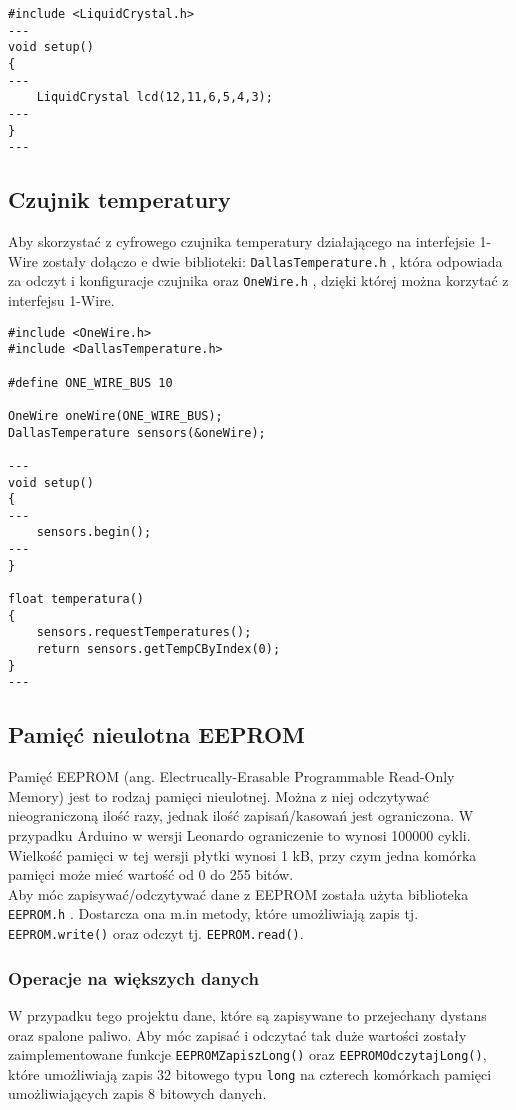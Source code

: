 \begin{lstlisting}[label=list:lcd_setup,caption=Inicjalizacja wyświetlacza,
basicstyle=\footnotesize\ttfamily]
#include <LiquidCrystal.h>
---
void setup()
{
---
    LiquidCrystal lcd(12,11,6,5,4,3);
---
}
---
\end{lstlisting}

\subsection{Czujnik temperatury}

Aby skorzystać z cyfrowego czujnika temperatury działającego na interfejsie 1-Wire zostały dołączo e dwie biblioteki: \texttt{DallasTemperature.h} \cite{lib_dallas}, która odpowiada za odczyt i konfiguracje czujnika oraz \texttt{OneWire.h} \cite{lib_onewire}, dzięki której można korzytać z interfejsu 1-Wire.

\begin{lstlisting}[label=list:d18s20_setup,caption=Inicjalizacja czujnika i odczyt temperatury,
basicstyle=\footnotesize\ttfamily]
#include <OneWire.h>
#include <DallasTemperature.h>

#define ONE_WIRE_BUS 10

OneWire oneWire(ONE_WIRE_BUS);
DallasTemperature sensors(&oneWire);

---
void setup()
{
---
    sensors.begin();
---
}

float temperatura() 
{
    sensors.requestTemperatures();
    return sensors.getTempCByIndex(0);
}
---
\end{lstlisting}


\subsection{Pamięć nieulotna EEPROM}
Pamięć EEPROM (ang. Electrucally-Erasable Programmable Read-Only Memory) jest to rodzaj pamięci nieulotnej. Można z niej odczytywać nieograniczoną ilość razy, jednak ilość zapisań/kasowań jest ograniczona. W przypadku Arduino w wersji Leonardo ograniczenie to wynosi 100000 cykli. Wielkość pamięci w tej wersji płytki wynosi 1 kB, przy czym jedna komórka pamięci może mieć wartość od 0 do 255 bitów.\\
Aby móc zapisywać/odczytywać dane z EEPROM została użyta biblioteka \texttt{EEPROM.h} \cite{lib_eeprom}. Dostarcza ona m.in metody, które umożliwiają zapis tj. \texttt{EEPROM.write()} oraz odczyt tj. \texttt{EEPROM.read()}.
\subsubsection{Operacje na większych danych}
W przypadku tego projektu dane, które są zapisywane to przejechany dystans oraz spalone paliwo. Aby móc zapisać i odczytać tak duże wartości zostały zaimplementowane funkcje \texttt{EEPROMZapiszLong()} oraz \texttt{EEPROMOdczytajLong()}, które umożliwiają zapis 32 bitowego typu \texttt{long} na czterech komórkach pamięci umożliwiających zapis 8 bitowych danych.

